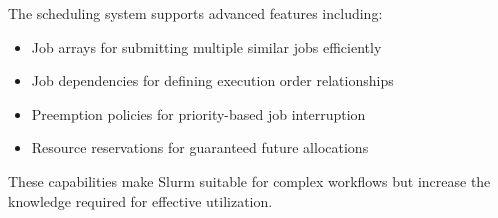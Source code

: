 The scheduling system supports advanced features including:
\begin{itemize}
    \item Job arrays for submitting multiple similar jobs efficiently
    \item Job dependencies for defining execution order relationships
    \item Preemption policies for priority-based job interruption
    \item Resource reservations for guaranteed future allocations
\end{itemize}

These capabilities make Slurm suitable for complex workflows but increase the knowledge required for effective utilization.
